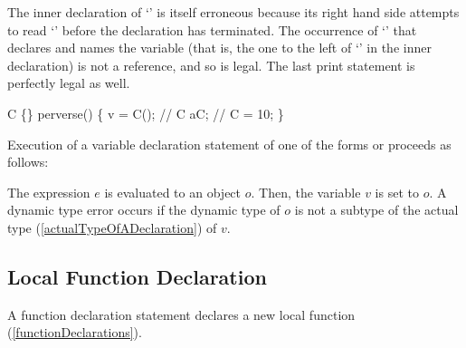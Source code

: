 \documentclass[makeidx]{article}
\begin{document}
{{The inner declaration of `' is itself erroneous
because its right hand side attempts to
read `' before the declaration has terminated.
The occurrence of `' that declares and names the variable
(that is, the one to the left of `\code{=}' in the inner declaration)
is not a reference, and so is legal.
The last print statement is perfectly legal as well.
}


\begin{dartCode}
\CLASS{} C \{\}
perverse() \{
  \VAR{} v = \NEW{} C(); // 
  C aC; // 
  \VAR{} C = 10;
\}
\end{dartCode}


\LMHash{}%
Execution of a variable declaration statement of one of the forms
 or
proceeds as follows:

\LMHash{}%
The expression $e$ is evaluated to an object $o$.
Then, the variable $v$ is set to $o$.
A dynamic type error occurs
if the dynamic type of $o$ is not a subtype of the actual type
(\ref{actualTypeOfADeclaration})
of $v$.



\subsection{Local Function Declaration}

\LMHash{}%
A function declaration statement declares a new local function (\ref{functionDeclarations}).

}
\end{document}
